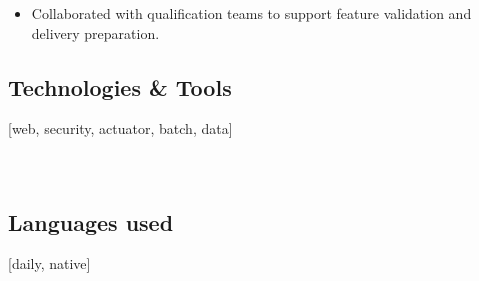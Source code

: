 {\begin{itemize}
        \item Collaborated with qualification teams to support feature validation and delivery preparation.
    \end{itemize}

    \subsection{Technologies \& Tools}
     [web, security, actuator, batch, data]\\
     \\
      \\
       
    
    \subsection{Languages used}
    [daily, native]
}
\makebody
\clearpage


